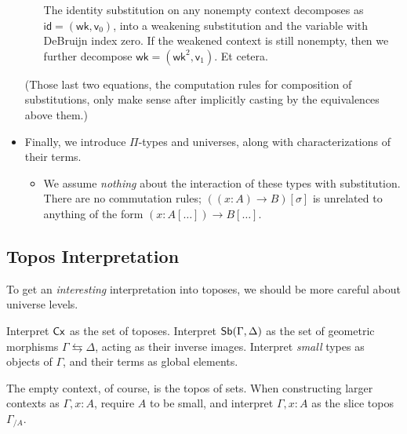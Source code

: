 \documentclass{article}
\begin{document}
\begin{itemize}
\begin{itemize}
        The identity substitution on any nonempty context decomposes as \(\mathsf{id} = (\mathsf{wk},\mathsf{v}_0)\),
        into a weakening substitution and the variable with DeBruijn index zero.
        If the weakened context is still nonempty, then we further decompose \(\mathsf{wk} = (\mathsf{wk}^2,\mathsf{v}_1)\).
        Et cetera.
    \end{itemize}
    (Those last two equations, the computation rules for composition of substitutions,
    only make sense after implicitly casting by the equivalences above them.)
    \item Finally, we introduce \(\Pi\)-types and universes, along with characterizations of their terms.
    \begin{itemize}
        \item We assume \emph{nothing} about the interaction of these types with substitution.
        There are no commutation rules; \(((x : A) \to B)[\sigma]\) is unrelated to anything of the form \((x : A[\dots]) \to B[\dots]\).
    \end{itemize}
\end{itemize}

\subsection{Topos Interpretation}

To get an \emph{interesting} interpretation into toposes, we should be more careful about universe levels.

Interpret \(\mathsf{Cx}\) as the set of toposes. Interpret \(\mathsf{Sb}(\Gamma, \Delta)\)
as the set of geometric morphisms \(\Gamma \leftrightarrows \Delta\), acting as their inverse images.
Interpret \emph{small} types as objects of \(\Gamma\), and their terms as global elements.

The empty context, of course, is the topos of sets.
When constructing larger contexts as \(\Gamma, x : A\), require \(A\) to be small,
and interpret \(\Gamma, x : A\) as the slice topos \(\Gamma_{/A}\).
\end{document}
